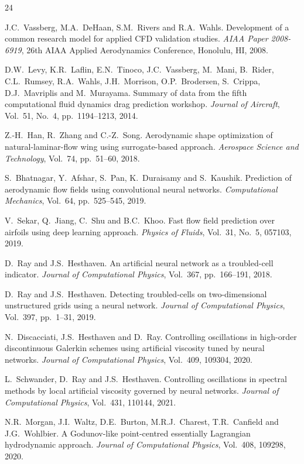 \documentclass{WCCM-ECCOMAS_2026_Full_Paper}
\begin{document}
\begin{thebibliography}{24}

J.C.~Vassberg, M.A.~DeHaan, S.M.~Rivers and R.A.~Wahls.
Development of a common research model for applied CFD validation
studies.
\textit{AIAA Paper 2008-6919}, 26th AIAA Applied Aerodynamics
Conference, Honolulu, HI, 2008.

D.W.~Levy, K.R.~Laflin, E.N.~Tinoco, J.C.~Vassberg, M.~Mani,
B.~Rider, C.L.~Rumsey, R.A.~Wahls, J.H.~Morrison, O.P.~Brodersen,
S.~Crippa, D.J.~Mavriplis and M.~Murayama.
Summary of data from the fifth computational fluid dynamics drag
prediction workshop.
\textit{Journal of Aircraft}, Vol.~51, No.~4, pp.~1194--1213, 2014.

Z.-H.~Han, R.~Zhang and C.-Z.~Song.
Aerodynamic shape optimization of natural-laminar-flow wing using
surrogate-based approach.
\textit{Aerospace Science and Technology}, Vol.~74, pp.~51--60, 2018.

S.~Bhatnagar, Y.~Afshar, S.~Pan, K.~Duraisamy and S.~Kaushik.
Prediction of aerodynamic flow fields using convolutional neural
networks.
\textit{Computational Mechanics}, Vol.~64, pp.~525--545, 2019.

V.~Sekar, Q.~Jiang, C.~Shu and B.C.~Khoo.
Fast flow field prediction over airfoils using deep learning approach.
\textit{Physics of Fluids}, Vol.~31, No.~5, 057103, 2019.

D.~Ray and J.S.~Hesthaven.
An artificial neural network as a troubled-cell indicator.
\textit{Journal of Computational Physics}, Vol.~367, pp.~166--191, 2018.

D.~Ray and J.S.~Hesthaven.
Detecting troubled-cells on two-dimensional unstructured grids using
a neural network.
\textit{Journal of Computational Physics}, Vol.~397, pp.~1--31, 2019.

N.~Discacciati, J.S.~Hesthaven and D.~Ray.
Controlling oscillations in high-order discontinuous Galerkin schemes
using artificial viscosity tuned by neural networks.
\textit{Journal of Computational Physics}, Vol.~409, 109304, 2020.

L.~Schwander, D.~Ray and J.S.~Hesthaven.
Controlling oscillations in spectral methods by local artificial
viscosity governed by neural networks.
\textit{Journal of Computational Physics}, Vol.~431, 110144, 2021.

N.R.~Morgan, J.I.~Waltz, D.E.~Burton, M.R.J.~Charest,
T.R.~Canfield and J.G.~Wohlbier.
A Godunov-like point-centred essentially Lagrangian hydrodynamic
approach.
\textit{Journal of Computational Physics}, Vol.~408, 109298, 2020.


\end{thebibliography}
\end{document}
